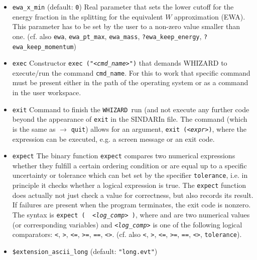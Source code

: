 \documentclass[12pt]{book}
\newcommand{\ttt}[1]{\texttt{#1}}
\newcommand{\whizard}{\texttt{WHIZARD}}
\begin{document}
\begin{itemize}
equivalent $W$ approximation (EWA). If not set, \whizard\ simply
takes the collider energy, $\sqrt{s}$. (cf. also \ttt{ewa},
\ttt{ewa\_x\_min}, \ttt{ewa\_mass}, \ttt{?ewa\_keep\_energy},
\ttt{?ewa\_keep\_momentum})  
\item
\ttt{ewa\_x\_min} \qquad (default: \ttt{0}) \newline
Real parameter that sets the lower cutoff for the energy fraction in
the splitting for the equivalent $W$ approximation (EWA). This
parameter has to be set by the user to a non-zero value smaller than
one. (cf. also \ttt{ewa}, \ttt{ewa\_pt\_max}, \ttt{ewa\_mass},
\ttt{?ewa\_keep\_energy}, \ttt{?ewa\_keep\_momentum}) 
\item
\ttt{exec} \newline
Constructor \ttt{exec ("{\em <cmd\_name>}")} that demands WHIZARD to
execute/run the command \ttt{cmd\_name}. For this to work that
specific command must be present either in the path of the operating
system or as a command in the user workspace. 
\item
\ttt{exit} \newline
Command to finish the \whizard\ run (and not execute any further code
beyond the appearance of \ttt{exit} in the SINDARIn file. The command
(which is the same as $\to$ \ttt{quit}) allows for an argument,
\ttt{exit ({\em <expr>})}, where the expression can be executed, e.g. a
screen message or an exit code.
\item
\ttt{expect} \newline
The binary function \ttt{expect} compares two numerical expressions
whether they fulfill a certain ordering condition or are equal up
to a specific uncertainty or tolerance which can bet set by the
specifier \ttt{tolerance}, i.e. in principle it checks whether a
logical expression is true. The \ttt{expect} function does actually
not just check a value for correctness, but also records its result.
If failures are present when the program terminates, the exit code is
nonzero. The syntax is  \ttt{expect ({\em <num1>} {\em
<log\_comp>} {\em <num2>})}, where \ttt{{\em <num1>}} and 
\ttt{{\em <num2>}} are two numerical values (or 
corresponding variables) and  \ttt{{\em <log\_comp>}} is one of the following
logical comparators: \ttt{<}, \ttt{>}, \ttt{<=},  \ttt{>=}, \ttt{==},
\ttt{<>}. 
(cf. also \ttt{<}, \ttt{>}, \ttt{<=},  \ttt{>=}, \ttt{==}, \ttt{<>},
\ttt{tolerance}).
\item
\ttt{\$extension\_ascii\_long} \qquad (default: \ttt{"long.evt"}) \newline

\end{itemize}
\end{document}
